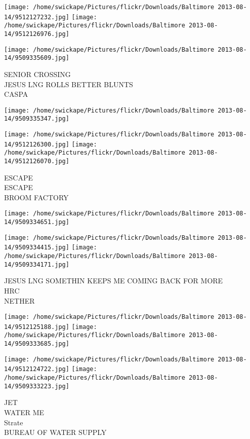 \documentclass[10pt,letterpaper]{article}
\begin{document}
\texttt{[image: /home/swickape/Pictures/flickr/Downloads/Baltimore 2013-08-14/9512127232.jpg]}
\texttt{[image: /home/swickape/Pictures/flickr/Downloads/Baltimore 2013-08-14/9512126976.jpg]}

\texttt{[image: /home/swickape/Pictures/flickr/Downloads/Baltimore 2013-08-14/9509335609.jpg]}

SENIOR CROSSING\\
JESUS LNG ROLLS BETTER BLUNTS\\
CASPA\\
\pagebreak

\texttt{[image: /home/swickape/Pictures/flickr/Downloads/Baltimore 2013-08-14/9509335347.jpg]}

\vspace{0.25in}
\texttt{[image: /home/swickape/Pictures/flickr/Downloads/Baltimore 2013-08-14/9512126300.jpg]}
\texttt{[image: /home/swickape/Pictures/flickr/Downloads/Baltimore 2013-08-14/9512126070.jpg]}

ESCAPE\\
ESCAPE\\
BROOM FACTORY\\
\pagebreak

\texttt{[image: /home/swickape/Pictures/flickr/Downloads/Baltimore 2013-08-14/9509334651.jpg]}

\vspace{0.25in}
\texttt{[image: /home/swickape/Pictures/flickr/Downloads/Baltimore 2013-08-14/9509334415.jpg]}
\texttt{[image: /home/swickape/Pictures/flickr/Downloads/Baltimore 2013-08-14/9509334171.jpg]}

JESUS LNG SOMETHIN KEEPS ME COMING BACK FOR MORE\\
HRC\\
NETHER\\
\pagebreak

\texttt{[image: /home/swickape/Pictures/flickr/Downloads/Baltimore 2013-08-14/9512125188.jpg]}
\texttt{[image: /home/swickape/Pictures/flickr/Downloads/Baltimore 2013-08-14/9509333685.jpg]}

\texttt{[image: /home/swickape/Pictures/flickr/Downloads/Baltimore 2013-08-14/9512124722.jpg]}
\texttt{[image: /home/swickape/Pictures/flickr/Downloads/Baltimore 2013-08-14/9509333223.jpg]}

JET\\
WATER ME\\
Strate\\
BUREAU OF WATER SUPPLY\\
\pagebreak
\end{document}
